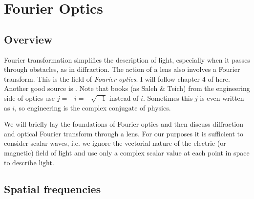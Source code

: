 \renewcommand{\lastmod}{October 11, 2023}
\renewcommand{\chapterauthors}{Markus Lippitz}

\chapter{Fourier Optics}

\section{Overview}
Fourier transformation simplifies the description of light, especially when it passes through obstacles, as in diffraction. The action of a lens also involves a Fourier transform. This is the field of \emph{Fourier optics}. I will follow chapter 4 of \cite{SalehTeich1991} here. Another good source is \cite{Goodman2005}. Note that books (as Saleh \& Teich) from the engineering  side of optics use $j = - i = - \sqrt{-1}$ instead of $i$. Sometimes this $j$ is even written as $i$, so engineering is the complex conjugate of physics.


We will briefly lay the foundations of Fourier optics and then discuss diffraction and optical Fourier transform through a lens. For our purposes it is sufficient to consider scalar waves, i.e. we ignore the vectorial nature of the electric (or magnetic) field of light and use only a complex scalar value at each point in space to describe light.

\section{Spatial frequencies}

